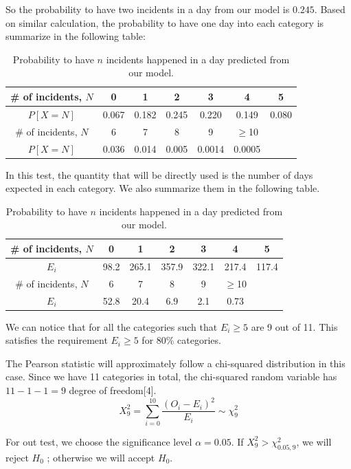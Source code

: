 \documentclass[11pt,a4paper,english]{article}
\begin{document}
So the probability to have two incidents in a day from our model is $0.245$.
Based on similar calculation, the probability to have one day into each category is summarize in the following table:
\begin{table}[htbp]
    \centering
	\begin{tabular}{c|cccccc}
		\hline
		\# of incidents, $N$ & 0 & 1 & 2 & 3 & 4 & 5\\
		\hline
		$P[X = N]$ & 0.067 & 0.182 & 0.245 & 0.220 & 0.149 & 0.080\\ 
		\hline
		\# of incidents, $N$  & 6 & 7 & 8 & 9 & $\geq$10 & \\
		\hline
		$P[X = N]$  & 0.036 & 0.014 & 0.005 & 0.0014 & 0.0005 & \\ 
		\hline
    \end{tabular}
	\caption{Probability to have $n$ incidents happened in a day predicted from our model.}
\end{table}

In this test, the quantity that will be directly used is the number of days expected in each category. We also summarize them in the following table.

\begin{table}[htbp]
    \centering
	\begin{tabular}{c|cccccc}
		\hline
		\# of incidents, $N$ & 0 & 1 & 2 & 3 & 4 & 5\\
		\hline
		$E_{i}$ & 98.2 & 265.1 & 357.9 & 322.1 & 217.4 & 117.4\\ 
		\hline
		\# of incidents, $N$  & 6 & 7 & 8 & 9 & $\geq$10 & \\
		\hline
		$E_{i}$  & 52.8 & 20.4 & 6.9 & 2.1 & 0.73 & \\ 
		\hline
    \end{tabular}
	\caption{Probability to have $n$ incidents happened in a day predicted from our model.}
\end{table}

We can notice that for all the categories such that $E_{i} \geq 5$ are 9 out of 11. This satisfies the requirement $E_{i} \geq 5$ for 80\% categories.

The Pearson statistic will approximately follow a chi-squared distribution in this case. Since we have 11 categories in total, the chi-squared random variable has $11-1-1 = 9$ degree of freedom[4].
\[X^{2}_{9} = \sum_{i = 0}^{10}
\frac{(O_{i}-E_{i})^{2}}{E_{i}} \sim \chi_{9}^{2}\]

For out test, we choose the significance level $\alpha = 0.05$. If $X^{2}_{9} > \chi_{0.05,9}^{2}$, we will reject $H_{0}$ ; otherwise we will accept $H_{0}$.
\end{document}

